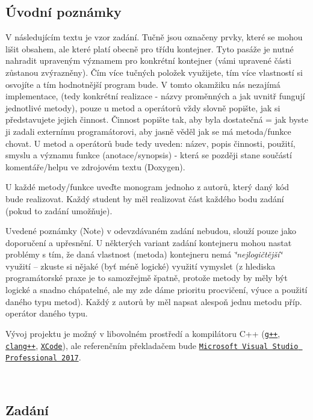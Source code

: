 \subsection*{Úvodní poznámky}

V následujícím textu je vzor zadání. Tučně jsou označeny prvky, které se mohou lišit obsahem, ale které platí obecně pro třídu kontejner. Tyto pasáže je nutné nahradit upraveným významem pro konkrétní kontejner (vámi upravené části zůstanou zvýrazněny). Čím více tučných položek využijete, tím více vlastností si osvojíte a tím hodnotnější program bude. V tomto okamžiku nás nezajímá implementace, (tedy konkrétní realizace -\/ názvy proměnných a jak uvnitř fungují jednotlivé metody), pouze u metod a operátorů vždy slovně popište, jak si představujete jejich činnost. Činnost popište tak, aby byla dostatečná = jak byste ji zadali externímu programátorovi, aby jasně věděl jak se má metoda/funkce chovat. U metod a operátorů bude tedy uveden\+: název, popis činnosti, použití, smyslu a významu funkce (anotace/synopsis) -\/ která se později stane součástí komentáře/helpu ve zdrojovém textu (Doxygen).

U každé metody/funkce uveďte monogram jednoho z autorů, který daný kód bude realizovat. Každý student by měl realizovat část každého bodu zadání (pokud to zadání umožňuje).

Uvedené poznámky (Note) v odevzdávaném zadání nebudou, slouží pouze jako doporučení a upřesnění. U některých variant zadání kontejneru mohou nastat problémy s tím, že daná vlastnost (metoda) kontejneru nemá {\itshape \char`\"{}nejlogičtější\char`\"{}} využití – zkuste si nějaké (byť méně logické) využití vymyslet (z hlediska programátorské praxe je to samozřejmě špatně, protože metody by měly být logické a snadno chápatelné, ale my zde dáme prioritu procvičení, výuce a použití daného typu metod). Každý z autorů by měl napsat alespoň jednu metodu příp. operátor daného typu.

Vývoj projektu je možný v libovolném prostředí a kompilátoru C++ (\href{http://gcc.gnu.org/}{\tt g++}, \href{http://clang.llvm.org/}{\tt clang++}, \href{https://developer.apple.com/xcode/download/}{\tt X\+Code}), ale referenčním překladačem bude \href{http://www.visualstudio.com/}{\tt Microsoft Visual Studio Professional 2017}.

~\newline
~\newline


\subsection*{Zadání}

